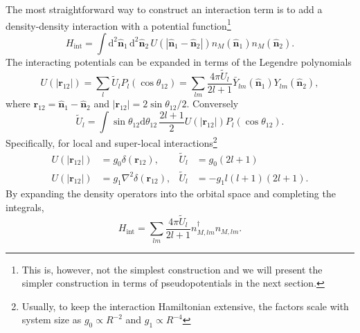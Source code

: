 \documentclass{timesjhep}
\begin{document}
The most straightforward way to construct an interaction term is to add a density-density interaction with a potential function\footnote{This is, however, not the simplest construction and we will present the simpler construction in terms of pseudopotentials in the next section.}
\begin{equation}
    H_\mathrm{int}=\int\mathrm{d}^2\hat{\mathbf{n}}_1\,\mathrm{d}^2\hat{\mathbf{n}}_2\,U(|\hat{\mathbf{n}}_1-\hat{\mathbf{n}}_2|)n_M(\hat{\mathbf{n}}_1)n_M(\hat{\mathbf{n}}_2).
\end{equation}
The interacting potentials can be expanded in terms of the Legendre polynomials
\begin{equation}
    U(|\mathbf{r}_{12}|)=\sum_l\tilde{U}_lP_l(\cos\theta_{12})=\sum_{lm}\frac{4\pi\tilde{U}_l}{2l+1}\bar{Y}_{lm}(\hat{\mathbf{n}}_1)Y_{lm}(\hat{\mathbf{n}}_2),
\end{equation}
where $\mathbf{r}_{12}=\hat{\mathbf{n}}_1-\hat{\mathbf{n}}_2$ and $|\mathbf{r}_{12}|=2\sin\theta_{12}/2$. Conversely
\begin{equation}
    \tilde{U}_l=\int\sin\theta_{12}\mathrm{d}\theta_{12}\,\frac{2l+1}{2}U(|\mathbf{r}_{12}|)P_l(\cos\theta_{12}).
\end{equation}
Specifically, for local and super-local interactions\footnote{Usually, to keep the interaction Hamiltonian extensive, the factors scale with system size as $g_0\propto R^{-2}$ and $g_1\propto R^{-4}$}
\begin{align}
    U(|\mathbf{r}_{12}|)&=g_0\delta(\mathbf{r}_{12}),&\tilde{U}_l&=g_0(2l+1)\nonumber\\
    U(|\mathbf{r}_{12}|)&=g_1\nabla^2\delta(\mathbf{r}_{12}),&\tilde{U}_l&=-g_1l(l+1)(2l+1).
\end{align}
By expanding the density operators into the orbital space and completing the integrals,
\begin{equation}
    H_\textrm{int}=\sum_{lm}\frac{4\pi \tilde{U}_l}{2l+1}n^\dagger_{M,lm}n_{M,lm}.
\end{equation}
\end{document}
